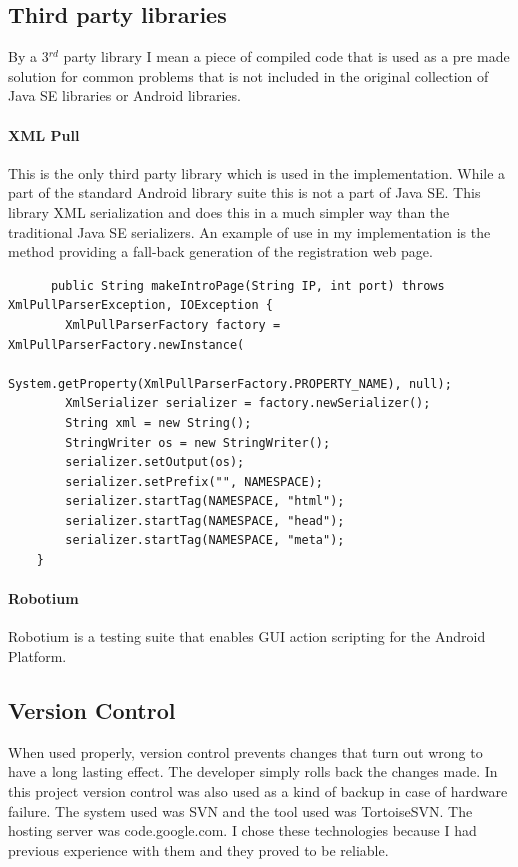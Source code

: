 \documentclass[11pt,twoside,a4paper]{book}
\begin{document}
\subsection{Third party libraries}
By a  3$^{rd}$ party library I mean a piece of compiled code that is used as a pre made solution for common problems that  is not included in the original collection of Java SE libraries or Android libraries.
\paragraph{XML Pull\cite{xmlpull}}
This is the only third party library which is used in the implementation. While a part of the standard Android library suite this is not a part of Java SE. This library XML serialization and does this in a much simpler way than the traditional Java SE serializers. An example of use in my implementation is the method providing a fall-back generation of the registration web page.\\
\begin{lstlisting}
      public String makeIntroPage(String IP, int port) throws XmlPullParserException, IOException {
        XmlPullParserFactory factory = XmlPullParserFactory.newInstance(
                System.getProperty(XmlPullParserFactory.PROPERTY_NAME), null);
        XmlSerializer serializer = factory.newSerializer();
        String xml = new String();
        StringWriter os = new StringWriter();
        serializer.setOutput(os);
        serializer.setPrefix("", NAMESPACE);
        serializer.startTag(NAMESPACE, "html");
        serializer.startTag(NAMESPACE, "head");
        serializer.startTag(NAMESPACE, "meta");
	}
\end{lstlisting}

\paragraph{Robotium\cite{robotium}}
Robotium is a testing suite that enables GUI action scripting for the Android Platform. 

\subsection{Version Control}
When used properly, version control prevents changes that turn out wrong to have a long lasting effect. The developer simply rolls back the changes made. In this project version control was also used as a kind of backup in case of hardware failure. The system used was SVN and the tool used was TortoiseSVN. The hosting server was code.google.com. I chose these technologies because I had previous experience with them and they proved to be reliable.	 
\end{document}
